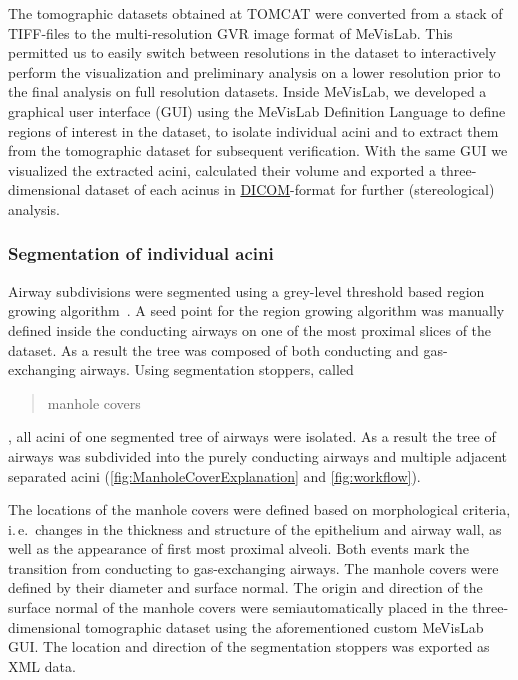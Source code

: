 \documentclass[paper=a4,DIV=calc,abstract,english]{scrartcl}
\newcommand{\ie}{i.\,e.\ }
\begin{document}
The tomographic datasets obtained at TOMCAT were converted from a stack of TIFF-files to the multi-resolution GVR image format of MeVisLab.
This permitted us to easily switch between resolutions in the dataset to interactively perform the visualization and preliminary analysis on a lower resolution prior to the final analysis on full resolution datasets.
Inside MeVisLab, we developed a graphical user interface (GUI) using the MeVisLab Definition Language to define regions of interest in the dataset, to isolate individual acini and to extract them from the tomographic dataset for subsequent verification.
With the same GUI we visualized the extracted acini, calculated their volume and exported a three-dimensional dataset of each acinus in \href{http://en.wikipedia.org/w/index.php?title=DICOM&oldid=511155074}{DICOM}-format for further (stereological) analysis.

\subsubsection{Segmentation of individual acini}
\label{sec:manhole covers}
Airway subdivisions were segmented using a grey-level threshold based region growing algorithm~\citep{Zucker1976}.
A seed point for the region growing algorithm was manually defined inside the conducting airways on one of the most proximal slices of the dataset.
As a result the tree was composed of both conducting and gas-exchanging airways.
Using segmentation stoppers, called \blockquote{manhole covers}, all acini of one segmented tree of airways were isolated.
As a result the tree of airways was subdivided into the purely conducting airways and multiple adjacent separated acini (\autoref{fig:ManholeCoverExplanation} and \ref{fig:workflow}).

The locations of the manhole covers were defined based on morphological criteria, \ie changes in the thickness and structure of the epithelium and airway wall, as well as the appearance of first most proximal alveoli.
Both events mark the transition from conducting to gas-exchanging airways.
The manhole covers were defined by their diameter and surface normal.
The origin and direction of the surface normal of the manhole covers were semiautomatically placed in the three-dimensional tomographic dataset using the aforementioned custom MeVisLab GUI.
The location and direction of the segmentation stoppers was exported as XML data.
\end{document}
